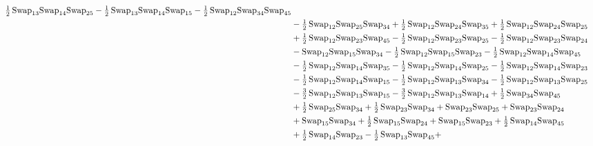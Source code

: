 \documentclass[12pt,dvipsnames,accepted=2016-08-18,a4paper,onecolumn]{quantumarticle}
\numberwithin{equation}{section}
\theoremstyle{definition}
\begin{document}
\begin{align*}
        \tfrac12\,\textnormal{Swap}_{13} \textnormal{Swap}_{14} \textnormal{Swap}_{25} - \tfrac12\,\textnormal{Swap}_{13} \textnormal{Swap}_{14} \textnormal{Swap}_{15} - \tfrac12\,\textnormal{Swap}_{12} \textnormal{Swap}_{34} \textnormal{Swap}_{45}\\ & - \tfrac12\,\textnormal{Swap}_{12} \textnormal{Swap}_{25} \textnormal{Swap}_{34} +
        \tfrac12\,\textnormal{Swap}_{12} \textnormal{Swap}_{24} \textnormal{Swap}_{35} + \tfrac12\,\textnormal{Swap}_{12} \textnormal{Swap}_{24} \textnormal{Swap}_{25}\\ & + \tfrac12\,\textnormal{Swap}_{12} \textnormal{Swap}_{23} \textnormal{Swap}_{45} - \tfrac12\,\textnormal{Swap}_{12} \textnormal{Swap}_{23} \textnormal{Swap}_{25} -
        \tfrac12\,\textnormal{Swap}_{12} \textnormal{Swap}_{23} \textnormal{Swap}_{24}\\ & - \textnormal{Swap}_{12} \textnormal{Swap}_{15} \textnormal{Swap}_{34} - \tfrac12\,\textnormal{Swap}_{12} \textnormal{Swap}_{15} \textnormal{Swap}_{23} - \tfrac12\,\textnormal{Swap}_{12} \textnormal{Swap}_{14} \textnormal{Swap}_{45} \\ & -
        \tfrac12\,\textnormal{Swap}_{12} \textnormal{Swap}_{14} \textnormal{Swap}_{35} - \tfrac12\,\textnormal{Swap}_{12} \textnormal{Swap}_{14} \textnormal{Swap}_{25} - \tfrac12\,\textnormal{Swap}_{12} \textnormal{Swap}_{14} \textnormal{Swap}_{23} \\ & - \tfrac12\,\textnormal{Swap}_{12} \textnormal{Swap}_{14} \textnormal{Swap}_{15} -
        \tfrac12\,\textnormal{Swap}_{12} \textnormal{Swap}_{13} \textnormal{Swap}_{34} - \tfrac12\,\textnormal{Swap}_{12} \textnormal{Swap}_{13} \textnormal{Swap}_{25}\\ & - \tfrac32\,\textnormal{Swap}_{12} \textnormal{Swap}_{13} \textnormal{Swap}_{15} - \tfrac32\,\textnormal{Swap}_{12} \textnormal{Swap}_{13} \textnormal{Swap}_{14} +
        \tfrac12\,\textnormal{Swap}_{34} \textnormal{Swap}_{45} \\ & + \tfrac12\,\textnormal{Swap}_{25} \textnormal{Swap}_{34} + \tfrac12\,\textnormal{Swap}_{23} \textnormal{Swap}_{34} + \textnormal{Swap}_{23} \textnormal{Swap}_{25} + \textnormal{Swap}_{23} \textnormal{Swap}_{24} \\ & + \textnormal{Swap}_{15} \textnormal{Swap}_{34} +
        \tfrac12\,\textnormal{Swap}_{15} \textnormal{Swap}_{24} + \textnormal{Swap}_{15} \textnormal{Swap}_{23} + \tfrac12\,\textnormal{Swap}_{14} \textnormal{Swap}_{45} \\ & + \tfrac12\,\textnormal{Swap}_{14} \textnormal{Swap}_{23} - \tfrac12\,\textnormal{Swap}_{13} \textnormal{Swap}_{45} +

\end{align*}
\end{document}
